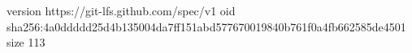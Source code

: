 version https://git-lfs.github.com/spec/v1
oid sha256:4a0ddddd25d4b135004da7ff151abd577670019840b761f0a4fb662585de4501
size 113
